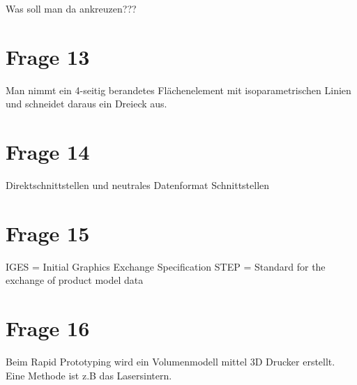 Was soll man da ankreuzen???


\section{Frage 13}

Man nimmt ein 4-seitig berandetes Flächenelement mit isoparametrischen Linien und schneidet daraus ein Dreieck aus.

\section{Frage 14}

Direktschnittstellen und neutrales Datenformat Schnittstellen

\section{Frage 15}

IGES = Initial Graphics Exchange Specification
STEP = Standard for the exchange of product model data

\section{Frage 16}

Beim Rapid Prototyping wird ein Volumenmodell mittel 3D Drucker erstellt. Eine Methode ist z.B das Lasersintern.





